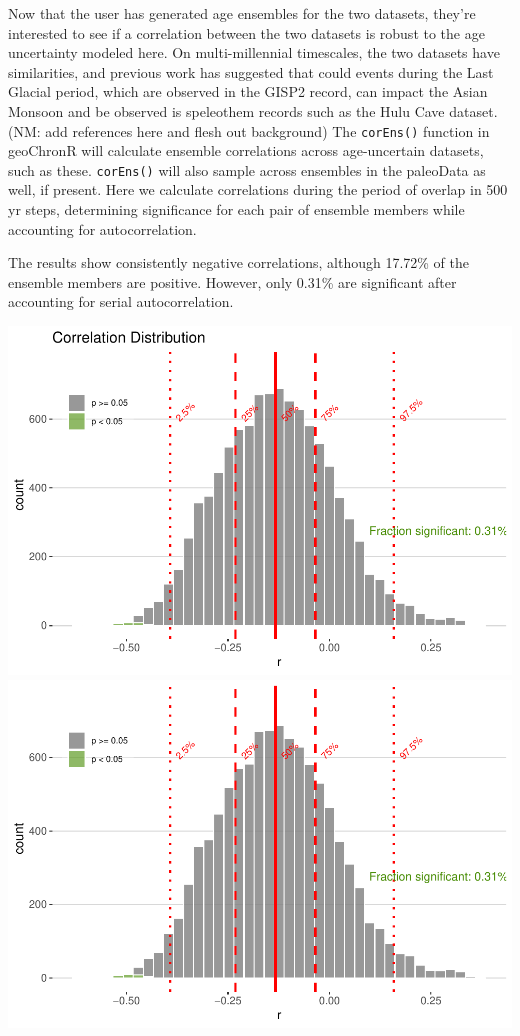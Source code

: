 \documentclass[gc, manuscript]{copernicus}
\begin{document}
Now that the user has generated age ensembles for the two datasets, they're interested to see if a correlation between the two datasets is robust to the age uncertainty modeled here.
On multi-millennial timescales, the two datasets have similarities, and previous work has suggested that could events during the Last Glacial period, which are observed in the GISP2 record, can impact the Asian Monsoon and be observed is speleothem records such as the Hulu Cave dataset. (NM: add references here and flesh out background)
The \texttt{corEns()} function in geoChronR will calculate ensemble correlations across age-uncertain datasets, such as these.
\texttt{corEns()} will also sample across ensembles in the paleoData as well, if present.
Here we calculate correlations during the period of overlap in 500 yr steps, determining significance for each pair of ensemble members while accounting for autocorrelation.

The results show consistently negative correlations, although 17.72\% of the ensemble members are positive.
However, only 0.31\% are significant after accounting for serial autocorrelation.

\includegraphics{geoChronR-paper_files/figure-latex/unnamed-chunk-7-1.pdf} \includegraphics{geoChronR-paper_files/figure-latex/unnamed-chunk-7-2.pdf}
\end{document}
